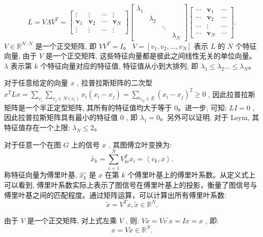 \[
L=V \Lambda V^{T}=\left[\begin{array}{cccc}
\vdots & \vdots & \cdots & \vdots \\
\boldsymbol{v}_1 & \boldsymbol{v}_2 & \cdots & \boldsymbol{v}_N \\
\vdots & \vdots & \cdots & \vdots
\end{array}\right]\left[\begin{array}{lllll}
\lambda_1 & & & \\
& \lambda_2 & & \\
& & \ddots & \\
& & & \lambda_N
\end{array}\right]\left[\begin{array}{ccc}
\cdots & \boldsymbol{v}_1 & \cdots \\
\cdots & \boldsymbol{v}_2 & \cdots \\
\cdots & \vdots & \cdots \\
\cdots & \boldsymbol{v}_N & \cdots
\end{array}\right].
\]
\({V} \in  {\mathbb{R}}^{{N} \cdot {N}}\) 是一个正交矩阵, 即 \({{{VV}}}^{{T}} = {I}\)。 \({V} = \left\lbrack  {v_{1}, v_{2}, \ldots , v_{{N}}}\right\rbrack\) 表示 \({L}\) 的 \({N}\) 个特征向量, 由于 \({V}\) 是一个正交矩阵, 这些特征向量都是彼此之间线性无关的单位向量。 \(\lambda\) 表示第 \({k}\) 个特征向量对应的特征值, 特征值从小到大排列, 即 \({\lambda }_{1} \leq  {\lambda }_{2}\ldots  \leq  {\lambda }_{{N}}\)。

对于任意给定的向量 \(x\) , 拉普拉斯矩阵的二次型 \({x}^{T}{Lx} = \sum\limits_{{v}_{i}}\sum\limits_{{{v}_{j} \in  N\left( {v}_{i}\right) }}{x}_{i}\left( {{x}_{i} - {x}_{j}}\right)  =\sum\limits_{{{{e}}_{{{ij}}} \in  {E}}}{\left( x_{{i}} - x_{{j}}\right) }^{2}  \geq  0\) , 因此拉普拉斯矩阵是一个半正定型矩阵, 其所有的特征值均大于等于 0。进一步, 可知: \({{LI}} = 0\) , 因此拉普拉斯矩阵具有最小的特征值 0 , 即 \({\lambda }_{1} = 0\)。另外可以证明, 对于 Lsym, 其特征值存在一个上限: \({\lambda }_{{N}} \leq  2\)。

对于任意一个在图 \({G}\) 上的信号 \({x}\) , 其图傅立叶变换为:
\[
\widetilde{{x}_{k}} = \sum\limits_{{i = 1}}^{N}{V}_{ki}^{T}{x}_{i} = \left\langle  {{v}_{k}, x}\right\rangle.
\]
称特征向量为傅里叶基, \(\hat{{x}_{k}}\) 是 \({x}\) 在第 \({k}\) 个傅里叶基上的傅里叶系数。从定义式上可以看到, 傅里叶系数实际上表示了图信号在傅里叶基上的投影，衡量了图信号与傅里叶基之间的匹配程度。通过矩阵运算，可以计算出所有傅里叶系数:
\[
\tilde{x} = {V}^{T}x, \tilde{x} \in  \mathbb{R}^{N}.
\]

由于 \({V}\) 是一个正交矩阵, 对上式左乘 \({V}\) , 则: \({V}\tilde{x} = {V}v^{\prime }{x} = {{Ix}} = {x}\) , 即:
\[
{x} = {V}\tilde{x} \in  \mathbb{R}^N.
\]

